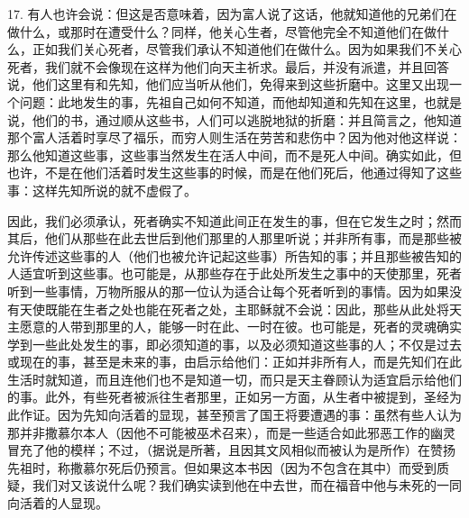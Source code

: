 17. 有人也许会说：但这是否意味着，因为富人说了这话，他就知道他的兄弟们在做什么，或那时在遭受什么？同样，他关心生者，尽管他完全不知道他们在做什么，正如我们关心死者，尽管我们承认不知道他们在做什么。因为如果我们不关心死者，我们就不会像现在这样为他们向天主祈求。最后，并没有派遣，并且回答说，他们这里有和先知，他们应当听从他们，免得来到这些折磨中。这里又出现一个问题：此地发生的事，先祖自己如何不知道，而他却知道和先知在这里，也就是说，他们的书，通过顺从这些书，人们可以逃脱地狱的折磨：并且简言之，他知道那个富人活着时享尽了福乐，而穷人则生活在劳苦和悲伤中？因为他对他这样说：那么他知道这些事，这些事当然发生在活人中间，而不是死人中间。确实如此，但也许，不是在他们活着时发生这些事的时候，而是在他们死后，他通过得知了这些事：这样先知所说的就不虚假了。\par

因此，我们必须承认，死者确实不知道此间正在发生的事，但在它发生之时；然而其后，他们从那些在此去世后到他们那里的人那里听说；并非所有事，而是那些被允许传述这些事的人（他们也被允许记起这些事）所告知的事；并且那些被告知的人适宜听到这些事。也可能是，从那些存在于此处所发生之事中的天使那里，死者听到一些事情，万物所服从的那一位认为适合让每个死者听到的事情。因为如果没有天使既能在生者之处也能在死者之处，主耶稣就不会说：因此，那些从此处将天主愿意的人带到那里的人，能够一时在此、一时在彼。也可能是，死者的灵魂确实学到一些此处发生的事，即必须知道的事，以及必须知道这些事的人；不仅是过去或现在的事，甚至是未来的事，由启示给他们：正如并非所有人，而是先知们在此生活时就知道，而且连他们也不是知道一切，而只是天主眷顾认为适宜启示给他们的事。此外，有些死者被派往生者那里，正如另一方面，从生者中被提到，圣经为此作证。因为先知向活着的显现，甚至预言了国王将要遭遇的事：虽然有些人认为那并非撒慕尔本人（因他不可能被巫术召来），而是一些适合如此邪恶工作的幽灵冒充了他的模样；不过，（据说是所著，且因其文风相似而被认为是所作）在赞扬先祖时，称撒慕尔死后仍预言。但如果这本书因（因为不包含在其中）而受到质疑，我们对又该说什么呢？我们确实读到他在中去世，而在福音中他与未死的一同向活着的人显现。\par

